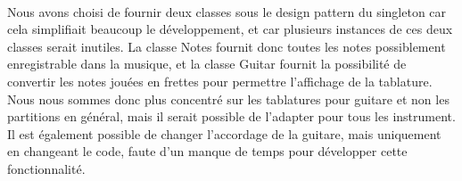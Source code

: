 \paragraph{}
Nous avons choisi de fournir deux classes sous le design pattern du singleton car cela simplifiait beaucoup le développement, et 
car plusieurs instances de ces deux classes serait inutiles. La classe Notes fournit donc toutes les notes possiblement enregistrable 
dans la musique, et la classe Guitar fournit la possibilité de convertir les notes jouées en frettes pour permettre l'affichage de la 
tablature. Nous nous sommes donc plus concentré sur les tablatures pour guitare et non les partitions en général, 
mais il serait possible de l'adapter pour tous les instrument. Il est également possible de changer l'accordage de la guitare, mais 
uniquement en changeant le code, faute d'un manque de temps pour développer cette fonctionnalité.